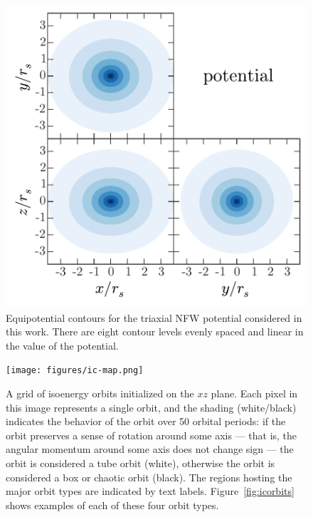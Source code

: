\documentclass[letterpaper,12pt,preprint]{aastex}
\begin{document}
\begin{figure}[!p]
\begin{center}
\includegraphics[width=\textwidth]{figures/potential.pdf}
\caption{Equipotential contours for the triaxial NFW potential considered in this work. There are eight contour levels evenly spaced and linear in the value of the potential. } \label{fig:potential}
\end{center}
\end{figure}

\begin{figure}[p]
\begin{center}
\texttt{[image: figures/ic-map.png]}
\caption{ A grid of isoenergy orbits initialized on the $xz$ plane. Each pixel in this image represents a single orbit, and the shading (white/black) indicates the behavior of the orbit over 50 orbital periods: if the orbit preserves a sense of rotation around some axis --- that is, the angular momentum around some axis does not change sign --- the orbit is considered a tube orbit (white), otherwise the orbit is considered a box or chaotic orbit (black). The regions hosting the major orbit types are indicated by text labels. Figure~\ref{fig:icorbits} shows examples of each of these four orbit types. } \label{fig:icmap} 
\end{center}
\end{figure}
\end{document}
